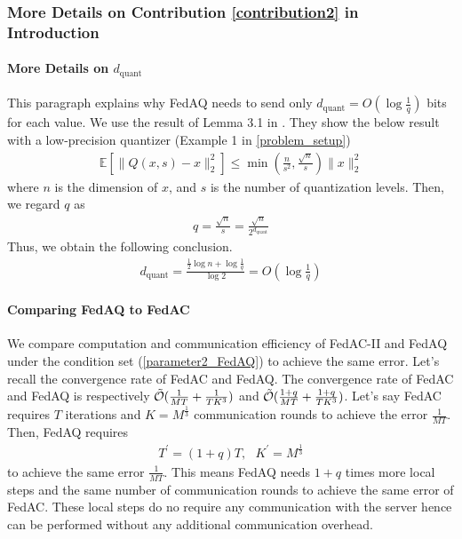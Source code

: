\documentclass[11pt]{article}
\begin{document}
\subsubsection{More Details on Contribution \ref{contribution2} in Introduction} \label{app:quantization_noise}

\paragraph{More Details on $d_{\textrm{quant}}$} This paragraph explains why FedAQ needs to send only $d_{\text{quant}} = O(\log \frac{1}{q})$ bits for each value. We use the result of Lemma 3.1 in \cite{Yeojoon-alistarh2017qsgd}. They show the below result with a low-precision quantizer (Example 1 in \cref{problem_setup})
\begin{align*}
    \mathbb{E}[\|Q(x, s) - x\|_2^2] \leq \min(\frac{n}{s^2}, \frac{\sqrt{n}}{s}) \|x\|_2^2
\end{align*}
where $n$ is the dimension of $x$, and $s$ is the number of quantization levels. Then, we regard $q$ as
\begin{align} \label{q_equation}
    q = \frac{\sqrt{n}}{s} = \frac{\sqrt{n}}{2^{d_{\textrm{quant}}}}
\end{align}
Thus, we obtain the following conclusion.
\begin{align*}
    d_{\textrm{quant}} = \frac{\frac{1}{2}\log n + \log \frac{1}{q}}{\log 2} = O(\log \frac{1}{q})
\end{align*}

\paragraph{Comparing FedAQ to FedAC}  We compare computation and communication efficiency of FedAC-II and FedAQ under the condition set (\ref{parameter2_FedAQ}) to achieve the same error. Let's recall the convergence rate of FedAC and FedAQ. The convergence rate of FedAC and FedAQ is respectively $\Tilde{\mathcal{O}}(\frac{1}{MT}+\frac{1}{TK^3})$ and $\Tilde{\mathcal{O}}(\frac{1+q}{MT}+\frac{1+q}{TK^3})$. Let's say FedAC requires $T$ iterations and $K = M^{\frac{1}{3}}$ communication rounds to achieve the error $\frac{1}{MT}$. Then, FedAQ requires
\begin{gather*}
    T^\prime = (1+q)T, \textrm{ } K^\prime = M^{\frac{1}{3}}
\end{gather*}
to achieve the same error $\frac{1}{MT}$. This means FedAQ needs $1+q$ times more local steps and the same number of communication rounds to achieve the same error of FedAC. These local steps do no require any communication with the server hence can be performed without any additional communication overhead.
\end{document}
